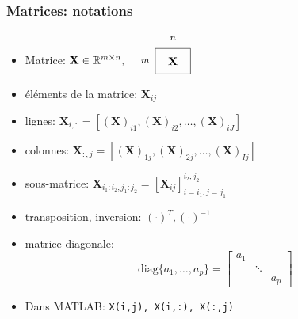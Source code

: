 \documentclass[9pt]{beamer}
\begin{document}
\begin{frame}
\frametitle{Matrices: notations}
\begin{itemize}[label=-]
\item  \alert{Matrice}: $\mathbf{X} \in \mathbb{R}^{m \times n},\quad
\raisebox{-0.25\height}{\begin{tikzpicture}[scale=0.8]
\draw(0,0.5) node (A) {$\mathbf{X}$};
\draw(-1.1,0.5) node (eq) {\footnotesize ${m}$};
\draw(0,1.4) node (eq) {\footnotesize ${n}$};
\draw(-0.7,0) rectangle (0.7,1);\end{tikzpicture}}$
\item \alert{éléments} de la matrice: $ \mathbf{X}_{ij}$ 
\item \alert{lignes}: $\mathbf{X}_{i,:} = [(\mathbf{X})_{i1}, (\mathbf{X})_{i2}, \ldots, (\mathbf{X})_{iJ} ]$
\item \alert{colonnes}: $\mathbf{X}_{:,j} = [(\mathbf{X})_{1j}, (\mathbf{X})_{2j}, \ldots, (\mathbf{X})_{Ij} ]$
\item \alert{sous-matrice}: $\mathbf{X}_{i_1:i_2,j_1:j_2} = [\mathbf{X}_{ij}]_{i=i_1,j=j_1}^{i_2,j_2}$

\item \alert{transposition}, \alert{inversion}: $(\cdot)^T, (\cdot)^{-1}$

\item \alert{matrice diagonale}:
\[
\text{diag}\{a_1, \dots,  a_p \} = 
\begin{bmatrix}
a_1 & 				& \\
		& \ddots 	& \\
		& 				& a_p
\end{bmatrix}
\]

\end{itemize}
\vfill
\begin{itemize}
	\item Dans MATLAB: {\tt X(i,j), \quad X(i,:), \quad X(:,j)}
\end{itemize}

\end{frame}
\end{document}
